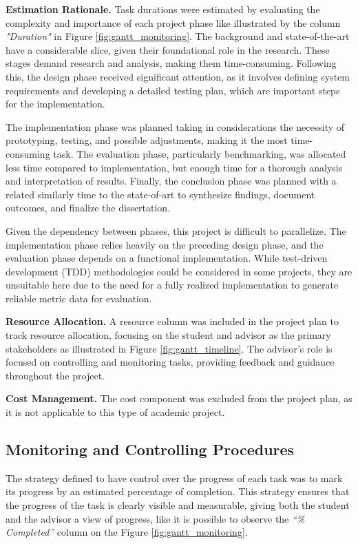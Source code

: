 \textbf{Estimation Rationale.} Task durations were estimated by evaluating the complexity and importance of each project phase like illustrated by the column \textit{"Duration"} in Figure \ref{fig:gantt_monitoring}. The background and state-of-the-art have a considerable slice, given their foundational role in the research. These stages demand research and analysis, making them time-consuming. Following this, the design phase received significant attention, as it involves defining system requirements and developing a detailed testing plan, which are important steps for the implementation.

The implementation phase was planned taking in considerations the necessity of prototyping, testing, and possible adjustments, making it the most time-consuming task. The evaluation phase, particularly benchmarking, was allocated less time compared to implementation, but enough time for a thorough analysis and interpretation of results. Finally, the conclusion phase was planned with a related similarly time to the state-of-art to synthesize findings, document outcomes, and finalize the dissertation.

Given the dependency between phases, this project is difficult to parallelize. The implementation phase relies heavily on the preceding design phase, and the evaluation phase depends on a functional implementation. While test-driven development (TDD) methodologies could be considered in some projects, they are unsuitable here due to the need for a fully realized implementation to generate reliable metric data for evaluation. 

\textbf{Resource Allocation.} A resource column was included in the project plan to track resource allocation, focusing on the student and advisor as the primary stakeholders as illustrated in Figure \ref{fig:gantt_timeline}. The advisor’s role is focused on controlling and monitoring tasks, providing feedback and guidance throughout the project.

\textbf{Cost Management.} The cost component was excluded from the project plan, as it is not applicable to this type of academic project.

\subsection{Monitoring and Controlling Procedures}

The strategy defined to have control over the progress of each task was to mark its progress by an estimated percentage of completion. This strategy ensures that the progress of the task is clearly visible and measurable, giving both the student and the advisor a view of progress, like it is possible to observe the \textit{“\% Completed”} column on the Figure \ref{fig:gantt_monitoring}.

